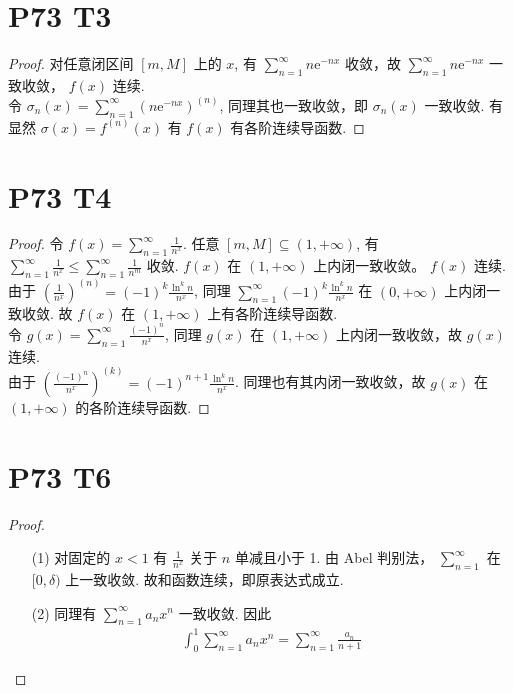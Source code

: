 \documentclass{article}
\begin{document}
\section*{P73 T3}

\begin{proof}
    对任意闭区间 $[m, M]$ 上的 $x$, 有 $\sum_{n = 1}^{\infty}n\mathrm{e}^{-nx}$ 收敛，故 $\sum_{n = 1}^{\infty}n\mathrm{e}^{-nx}$ 一致收敛， $f(x)$ 连续. \\
    令 $\sigma_n(x) = \sum_{n = 1}^{\infty}(n\mathrm{e}^{-nx})^{(n)}$, 同理其也一致收敛，即 $\sigma_n(x)$ 一致收敛. 有显然 $\sigma(x) = f^{(n)}(x)$ 有 $f(x)$ 有各阶连续导函数.
\end{proof}

\section*{P73 T4}

\begin{proof}
    令 $f(x) = \sum_{n = 1}^{\infty}\frac{1}{n^x}$. 任意 $[m, M] \subseteq (1, +\infty)$, 有 $\sum_{n = 1}^{\infty}\frac{1}{n^x} \leq \sum_{n = 1}^{\infty}\frac{1}{n^m}$ 收敛. $f(x)$ 在 $(1, +\infty)$ 上内闭一致收敛。 $f(x)$ 连续. \\
    由于 $\left(\frac{1}{n^x}\right)^{(n)} = (-1)^k\frac{\ln^k n}{n^x}$, 同理 $\sum_{n = 1}^{\infty}(-1)^k\frac{\ln^k n}{n^x}$ 在 $(0, +\infty)$ 上内闭一致收敛. 故 $f(x)$ 在 $(1, +\infty)$ 上有各阶连续导函数. \\
    令 $g(x) = \sum_{n = 1}^{\infty}\frac{(-1)^n}{n^x}$, 同理 $g(x)$ 在 $(1, +\infty)$ 上内闭一致收敛，故 $g(x)$ 连续. \\
    由于 $\left(\frac{(-1)^n}{n^x}\right)^{(k)} = (-1)^{n + 1}\frac{\ln^k n}{n^x}$. 同理也有其内闭一致收敛，故 $g(x)$ 在 $(1, +\infty)$ 的各阶连续导函数.
\end{proof}

\section*{P73 T6}

\begin{proof}
    \begin{itemize}
        \item [(1)] 对固定的 $x < 1$ 有 $\frac{1}{n^x}$ 关于 $n$ 单减且小于 1. 由 Abel 判别法， $\sum_{n = 1}^{\infty}$ 在 $[0, \delta)$ 上一致收敛. 故和函数连续，即原表达式成立.
        \item [(2)] 同理有 $\sum_{n = 1}^{\infty}a_nx^n$ 一致收敛. 因此
        \begin{align*}
            \int_{0}^{1}\sum_{n = 1}^{\infty}a_nx^n = \sum_{n = 1}^{\infty}\frac{a_n}{n + 1}
        \end{align*}
    \end{itemize}
\end{proof}
\end{document}
